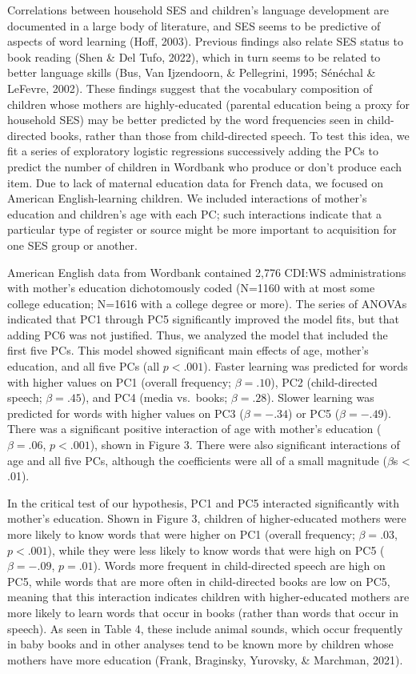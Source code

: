 \documentclass[10pt, letterpaper]{article}
\begin{document}
Correlations between household SES and children's language development
are documented in a large body of literature, and SES seems to be
predictive of aspects of word learning (Hoff, 2003). Previous findings
also relate SES status to book reading (Shen \& Del Tufo, 2022), which
in turn seems to be related to better language skills (Bus, Van
Ijzendoorn, \& Pellegrini, 1995; Sénéchal \& LeFevre, 2002). These
findings suggest that the vocabulary composition of children whose
mothers are highly-educated (parental education being a proxy for
household SES) may be better predicted by the word frequencies seen in
child-directed books, rather than those from child-directed speech. To
test this idea, we fit a series of exploratory logistic regressions
successively adding the PCs to predict the number of children in
Wordbank who produce or don't produce each item. Due to lack of maternal
education data for French data, we focused on American English-learning
children. We included interactions of mother's education and children's
age with each PC; such interactions indicate that a particular type of
register or source might be more important to acquisition for one SES
group or another.

American English data from Wordbank contained 2,776 CDI:WS
administrations with mother's education dichotomously coded (N=1160 with
at most some college education; N=1616 with a college degree or more).
The series of ANOVAs indicated that PC1 through PC5 significantly
improved the model fits, but that adding PC6 was not justified. Thus, we
analyzed the model that included the first five PCs. This model showed
significant main effects of age, mother's education, and all five PCs
(all \(p<.001\)). Faster learning was predicted for words with higher
values on PC1 (overall frequency; \(\beta=.10\)), PC2 (child-directed
speech; \(\beta=.45\)), and PC4 (media vs.~books; \(\beta=.28\)). Slower
learning was predicted for words with higher values on PC3
(\(\beta=-.34\)) or PC5 (\(\beta=-.49\)). There was a significant
positive interaction of age with mother's education (\(\beta=.06\),
\(p<.001\)), shown in Figure 3. There were also significant interactions
of age and all five PCs, although the coefficients were all of a small
magnitude (\(\beta\)s \textless{} .01).

In the critical test of our hypothesis, PC1 and PC5 interacted
significantly with mother's education. Shown in Figure 3, children of
higher-educated mothers were more likely to know words that were higher
on PC1 (overall frequency; \(\beta = .03\), \(p<.001\)), while they were
less likely to know words that were high on PC5 (\(\beta = -.09\),
\(p=.01\)). Words more frequent in child-directed speech are high on
PC5, while words that are more often in child-directed books are low on
PC5, meaning that this interaction indicates children with
higher-educated mothers are more likely to learn words that occur in
books (rather than words that occur in speech). As seen in Table 4,
these include animal sounds, which occur frequently in baby books and in
other analyses tend to be known more by children whose mothers have more
education (Frank, Braginsky, Yurovsky, \& Marchman, 2021).
\end{document}
